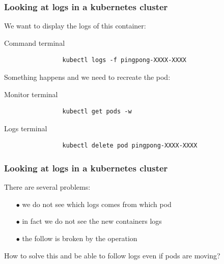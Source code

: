 	\begin{frame}[fragile]
		\frametitle{Looking at logs in a kubernetes cluster}
	
		We want to display the logs of this container:
		\begin{block}{Command terminal}
			\begin{verbatim}
				kubectl logs -f pingpong-XXXX-XXXX
			\end{verbatim}
		\end{block}
		
		Something happens and we need to recreate the pod:
		\begin{block}{Monitor terminal}
			\begin{verbatim}
				kubectl get pods -w
			\end{verbatim}
		\end{block}
		\begin{block}{Logs terminal}
			\begin{verbatim}
				kubectl delete pod pingpong-XXXX-XXXX
			\end{verbatim}
		\end{block}
	\end{frame}
	
	
	\begin{frame}[fragile]
		\frametitle{Looking at logs in a kubernetes cluster}
	
		There are several problems:
		\begin{itemize}
			\item[$\bullet$] we do not see which logs comes from which pod
			\item[$\bullet$] in fact we do not see the new containers logs
			\item[$\bullet$] the follow is broken by the operation
		\end{itemize}
		
		How to solve this and be able to follow logs even if pods are moving?
	\end{frame}

